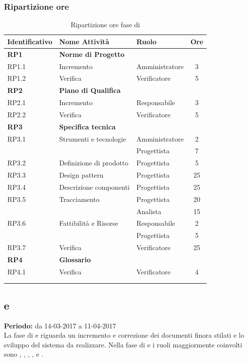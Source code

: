 \subsubsection{Ripartizione ore}
\bgroup
\begin{longtable}{|l|l|l|c|}
	\endfirsthead
	\hline
	\textbf{Identificativo} &
	\textbf{Nome Attività} &
	\textbf{Ruolo} &
	\textbf{Ore}\\
	\endhead
	\hline
	\textbf{RP1} & \textbf{Norme di Progetto} &  &  \\
	\hline
	{RP1.1} & {Incremento} & Amministratore  & 3\\
	\hline
	{RP1.2} & {Verifica} & Verificatore & 5 \\
	\hline
	\textbf{RP2} & \textbf{Piano di Qualifica}  & & \\
	\hline
	{RP2.1} & {Incremento} & Responsabile &  3\\
	\hline
	{RP2.2} & {Verifica} & Verificatore & 5 \\
	\hline
	\textbf{RP3} & \textbf{Specifica tecnica} & &  \\
	\hline
	{RP3.1} & {Strumenti e tecnologie} & Amministratore  &  2\\
	& & Progettista & 7 \\
	\hline
	{RP3.2} & {Definizione di prodotto} & Progettista  &  5\\
	\hline
	{RP3.3} & {Design pattern} & Progettista  &  25\\
	\hline
	{RP3.4} & {Descrizione componenti} & Progettista  &  25\\
	\hline
	{RP3.5} & {Tracciamento} & Progettista  &  20\\
	& & Analista & 15 \\
	\hline
	{RP3.6} & {Fattibilità e Risorse} & Responsabile  &  2\\
	& & Progettista & 5 \\
	\hline
	{RP3.7} & {Verifica} & Verificatore  &  25\\
	\hline
	\textbf{RP4} & \textbf{Glossario} & &  \\
	\hline
	{RP4.1} & {Verifica} & Verificatore &  4 \\
	\hline
	\\
	\caption{Ripartizione ore fase di \PA}
\end{longtable}
\egroup

\subsection{\PD e \Cod}
\textbf{Periodo:} da 14-03-2017 a 11-04-2017 \\
 La fase di \PD{} e \Cod{} riguarda un incremento e correzione dei documenti finora stilati e lo sviluppo del sistema da realizzare.
Nella fase di \PD{} e \Cod{} i ruoli maggiormente coinvolti sono \Programmatore, \Progettista, \Analista, \Responsabile, \Amministratore{} e \Verificatore.
